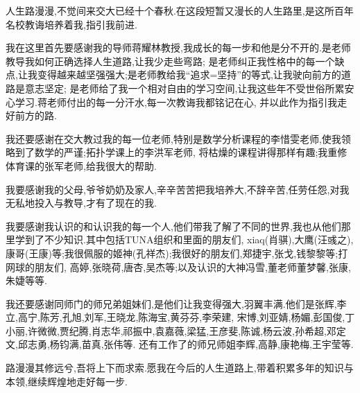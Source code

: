 人生路漫漫,不觉间来交大已经十个春秋.在这段短暂又漫长的人生路里,是这所百年名校教诲培养着我,指引我前进.

我在这里首先要感谢我的导师蒋耀林教授,我成长的每一步和他是分不开的.是老师教导我如何正确选择人生道路,让我少走些弯路;
是老师纠正我性格中的每一个缺点,让我变得越来越坚强强大;是老师教给我``追求=坚持''的等式,让我驶向前方的道路是意志坚定;
是老师给了我一个相对自由的学习空间,让我这些年不受世俗所累安心学习.蒋老师付出的每一分汗水,每一次教诲我都铭记在心,
并以此作为指引我走好前方的路.

我还要感谢在交大教过我的每一位老师,特别是数学分析课程的李惜雯老师,使我领略到了数学的严谨;拓扑学课上的李洪军老师,
将枯燥的课程讲得那样有趣;我重修体育课的张军老师,给我很大的帮助.

我要感谢我的父母,爷爷奶奶及家人,辛辛苦苦把我培养大,不辞辛苦,任劳任怨,对我无私地投入与教导,才有了现在的我.

我要感谢我认识的和认识我的每一个人,他们带我了解了不同的世界,我也从他们那里学到了不少知识.其中包括TUNA组织和里面的朋友们,
xiaq(肖骐),大鹰(汪彧之),康哥(王康)等;我很佩服的姬神(孔祥杰);我很好的朋友们,郑捷宇,张戈,钱黎黎等;打网球的朋友们,
高婷,张晓荷,唐杏,吴杰等;以及认识的大神冯雪,董老师董梦馨,张康,朱婕等等.

我还要感谢同师门的师兄弟姐妹们,是他们让我变得强大,羽翼丰满.他们是张辉,李立,高宁,陈芳,孔旭,刘军,王晓龙,陈海宝,黄芬芬,李荣建,
宋博,刘亚婧,杨媚,彭国俊,丁小丽,许微微,贾纪腾,肖志华,祁振中,袁嘉薇,梁猛,王彦斐,陈诚,杨云波,孙希超,邓定文,邱志勇,杨钧满,苗真,张伟等.
还有工作了的师兄师姐李辉,高静,康艳梅,王宇莹等.

路漫漫其修远兮,吾将上下而求索.愿我在今后的人生道路上,带着积累多年的知识与本领,继续辉煌地走好每一步.
